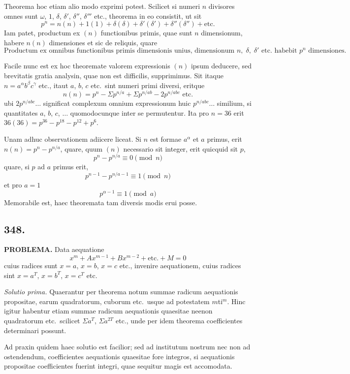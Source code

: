 \documentclass[12pt]{article}
\begin{document}
Theorema hoc etiam alio modo exprimi potest. Scilicet si numeri $n$ divisores omnes sunt $\omega$, $1$, $\delta$, $\delta'$, $\delta''$, $\delta'''$ etc., theorema in eo consistit, ut sit
\[
p^n = n(n) + 1(1) + \delta(\delta) + \delta'(\delta') + \delta''(\delta'') + \text{etc.}
\]
Iam patet, productum ex $(n)$ functionibus primis, quae sunt $n$ dimensionum, habere $n(n)$ dimensiones et sic de reliquis, quare
\[
\text{Productum ex omnibus functionibus primis dimensionis unius, dimensionum } n,\; \delta,\; \delta' \text{ etc.~habebit } p^n \text{ dimensiones.}
\]

Facile nunc est ex hoc theoremate valorem expressionis $(n)$ ipsum deducere, sed brevitatis gratia analysin, quae non est difficilis, supprimimus. Sit itaque $n=a^\alpha b^\beta c^\gamma$ etc., itaut $a$, $b$, $c$ etc.~sint numeri primi diversi, eritque
\[
n(n) = p^n - \Sigma p^{n/a} + \Sigma p^{n/ab} - 2p^{n/abc} \text{ etc.}
\]
ubi $2p^{n/abc}\ldots$ significat complexum omnium expressionum huic $p^{n/abc}\ldots$ similium, si quantitates $a$, $b$, $c$, $\ldots$ quomodocunque inter se permutentur. Ita pro $n=36$ erit $36(36) = p^{36} - p^{18} - p^{12} + p^6$.

Unam adhuc observationem adiicere liceat. Si $n$ est formae $a^\alpha$ et $a$ primus, erit $n(n) = p^n - p^{n/a}$, quare, quum $(n)$ necessario sit integer, erit quicquid sit $p$,
\[
p^n - p^{n/a} \equiv 0 \pmod{n}
\]
quare, si $p$ ad $a$ primus erit,
\[
p^{n-1} - p^{n/a-1} \equiv 1 \pmod{n}
\]
et pro $a=1$
\[
p^{\alpha-1} \equiv 1 \pmod{a}
\]
Memorabile est, haec theoremata tam diversis modis erui posse.

\subsection*{348.}

\textbf{PROBLEMA.} Data aequatione
\[
x^m + Ax^{m-1} + Bx^{m-2} + \text{etc.} + M = 0
\]
cuius radices sunt $x=a$, $x=b$, $x=c$ etc., invenire aequationem, cuius radices sint $x=a^T$, $x=b^T$, $x=c^T$ etc.

\textit{Solutio prima.} Quaerantur per theorema notum summae radicum aequationis propositae, earum quadratorum, cuborum etc.~usque ad potestatem $m$ti$^m$. Hinc igitur habentur etiam summae radicum aequationis quaesitae neenon quadratorum etc.~scilicet $\Sigma a^T$, $\Sigma a^{2T}$ etc., unde per idem theorema coefficientes determinari possunt.

Ad praxin quidem haec solutio est facilior; sed ad institutum nostrum nec non ad ostendendum, coefficientes aequationis quaesitae fore integros, si aequationis propositae coefficientes fuerint integri, quae sequitur magis est accomodata.
\end{document}
